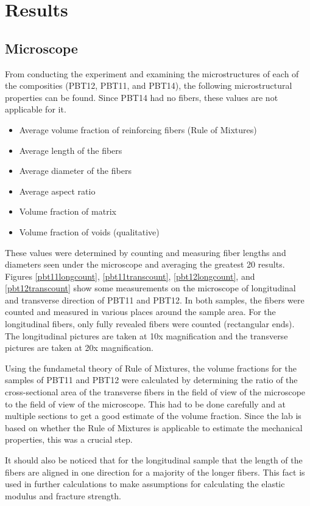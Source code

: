 \documentclass[11pt]{article}
\begin{document}
\section{Results}
\subsection{Microscope}
From conducting the experiment and examining the microstructures of each of the composities (PBT12, PBT11, and PBT14), the following microstructural properties can be found. Since PBT14 had no fibers, these values are not applicable for it.

\begin{itemize}
\item Average volume fraction of reinforcing fibers (Rule of Mixtures)
\item Average length of the fibers
\item Average diameter of the fibers
\item Average aspect ratio
\item Volume fraction of matrix
\item Volume fraction of voids (qualitative)
\end{itemize}

These values were determined by counting and measuring fiber lengths and diameters seen under the microscope and averaging the greatest 20 results. Figures \ref{pbt11longcount}, \ref{pbt11transcount}, \ref{pbt12longcount}, and \ref{pbt12transcount} show some measurements on the microscope of longitudinal and transverse direction of PBT11 and PBT12. In both samples, the fibers were counted and measured in various places around the sample area. For the longitudinal fibers, only fully revealed fibers were counted (rectangular ends). The longitudinal pictures are taken at 10x magnification and the transverse pictures are taken at 20x magnification.

Using the fundametal theory of Rule of Mixtures, the volume fractions for the samples of PBT11 and PBT12 were calculated by determining the ratio of the cross-sectional area of the transverse fibers in the field of view of the microscope to the field of view of the microscope. This had to be done carefully and at multiple sections to get a good estimate of the volume fraction. Since the lab is based on whether the Rule of Mixtures is applicable to estimate the mechanical properties, this was a crucial step.

It should also be noticed that for the longitudinal sample that the length of the fibers are aligned in one direction for a majority of the longer fibers. This fact is used in further calculations to make assumptions for calculating the elastic modulus and fracture strength.
\end{document}
